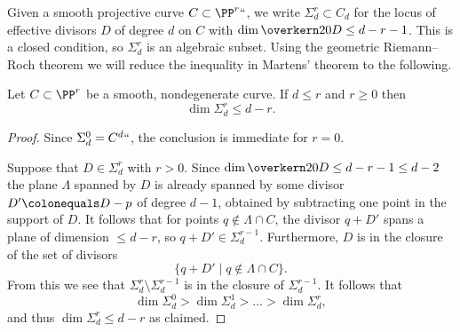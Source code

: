 Given
a smooth projective curve $C \subset \PP^r` `$, we write $
\Sigma^r_d
\subset C_d$
%
for the locus of effective divisors $D$ of degree $d$ on
$C$ with $\dim \overkern20 D \leq d-r-1$. This is a closed condition, so
$\Sigma^r_d$ is an algebraic subset. Using the
geometric Riemann--Roch theorem
we will reduce the inequality in Martens' theorem to the following.

\begin{lemma}\label{elementary secant plane lemma}
Let
%
$C \subset \PP^r$ be a smooth, nondegenerate curve. If $d \leq r$ and $r \geq 0$ then
$$
\dim \Sigma^r_d \leq d-r.
$$
\end{lemma}

\begin{proof}
Since $\Sigma^0_d = C^d` `$, the conclusion is immediate for $r=0$.

Suppose that  $D\in \Sigma^r_d$ with $r>0$. Since $\dim \overkern20 D\leq d-r-1\leq d-2$ the plane
$\Lambda$ spanned by $D$ is already spanned by some divisor  $D' \colonequals D -p$ of degree $d-1$,
obtained by subtracting one point  in the support of $D$.
It follows that for points $q\notin \Lambda \cap C$, the divisor $q+D'$ spans a plane of dimension $\leq d-r$,
so $q+D'\in \Sigma^{r-1}_{d}$.
Furthermore,  $D$ is in the closure of the set of divisors
$$
\{q+D' \mid q\notin \Lambda \cap C \}.
$$
From this we see that $\Sigma^r_d\setminus \Sigma^{r-1}_d$ is in the closure of  $\Sigma^{r-1}_d$. It follows that
$$
\dim \Sigma^0_d >  \dim \Sigma^1_d > \dots > \dim \Sigma^r_d,
$$
and thus $\dim \Sigma^r_d \leq d-r$ as claimed.
\end{proof}


